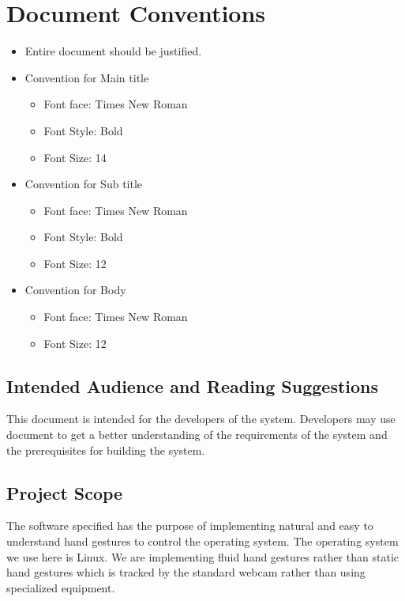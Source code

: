 \documentclass[11pt]{report}
\begin{document}
\section{Document Conventions}
\begin{itemize}
    \item Entire document should be justified.
    \item Convention for Main title
\begin{itemize}
    \item Font face: Times New Roman
\item Font Style: Bold
\item Font Size: 14
\end{itemize}
    
\item Convention for Sub title
\begin{itemize}
    
\item  Font face: Times New Roman
\item Font Style: Bold
\item Font Size: 12
\end{itemize}
\item Convention for Body

\begin{itemize}
    
\item Font face: Times New Roman
\item Font Size: 12
\end{itemize}
\end{itemize}

\subsection{Intended Audience and Reading Suggestions}
This document is intended for the developers of the system. Developers may use document to get a better understanding of the requirements of the system and the prerequisites for building the system.

\subsection{Project Scope}
The software specified has the purpose of implementing natural and easy to understand hand gestures to control the operating system. The operating system we use here is Linux. We are implementing fluid hand gestures rather than static hand gestures which is tracked by the standard webcam rather than using specialized equipment.
\end{document}
